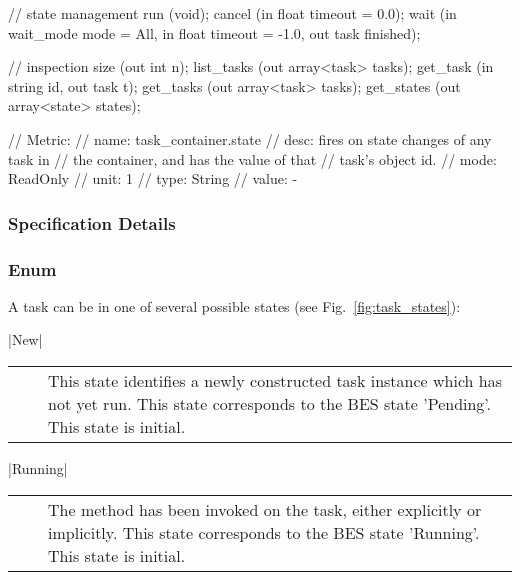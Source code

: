 \begin{myspec}
{{      // state management
      run               (void);
      cancel            (in  float           timeout =  0.0);
      wait              (in  wait_mode       mode    =  All,
                         in  float           timeout = -1.0,
                         out task            finished);
 
      // inspection
      size              (out int             n);
      list_tasks        (out array<task>     tasks);
      get_task          (in  string          id, 
                         out task            t);
      get_tasks         (out array<task>     tasks);
      get_states        (out array<state>    states);
 
      // Metric:
      //   name:  task_container.state
      //   desc:  fires on state changes of any task in
      //          the container, and has the value of that
      //          task's object id.
      //   mode:  ReadOnly
      //   unit:  1
      //   type:  String
      //   value: -
    }
  }
 \end{myspec}
 
 
 \subsubsection{Specification Details}
 
 
  \subsubsection*{Enum }
 
  A task can be in one of several possible states (see
  Fig.~\ref{fig:task_states}):
  
 
    |New|\\[1.5mm]
    \begin{tabular}{cp{110mm}}
      ~~ & This state identifies a newly constructed task
           instance which has not yet run.  This state corresponds to
           the BES state 'Pending'.   This state is initial.
    \end{tabular}
 
    |Running|\\[1.5mm]
    \begin{tabular}{cp{110mm}}
       ~~ & The \T{run()} method has been invoked on the task, either
            explicitly or implicitly.  This state corresponds to the
            BES state 'Running'.  This state is initial.  
    \end{tabular}
 
